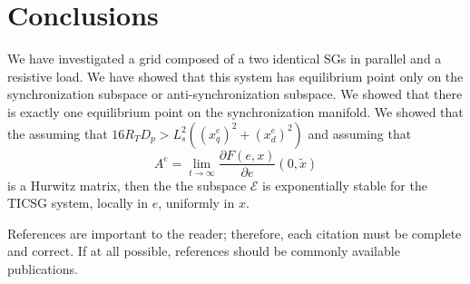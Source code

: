 \documentclass[letterpaper, 10 pt, conference]{ieeeconf}  %
\begin{document}
\section{Conclusions}

We have investigated  a grid composed of a two identical SGs in parallel and a resistive load. We have showed that this system has equilibrium point only on the synchronization subspace or anti-synchronization subspace. We showed that there is exactly one equilibrium point on the synchronization manifold. We showed that the assuming that $16 R_T D_p > L_s^2\left(\left(x_q^e\right)^2 +  \left(x_d^e\right)^2 \right)$  and assuming that 
$$ A^e = \lim_{t \to \infty} \frac{\partial F(e,x)}{\partial e}\left(0,\tilde{x}\right) $$ is a Hurwitz matrix, then the the subspace $\mathscr{E}$ is exponentially stable for the TICSG system, locally in $e$, uniformly in $x$.

References are important to the reader; therefore, each citation must be complete and correct. If at all possible, references should be commonly available publications.
\end{document}
